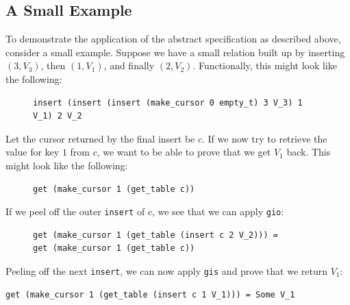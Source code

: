 \documentclass[a4paper,12pt]{article}
\begin{document}
\subsection{A Small Example} \label{subsec:ex}

To demonstrate the application of the abstract specification as described above, consider a small example. Suppose we have a small relation built up by inserting $(3,V_3)$, then $(1,V_1)$, and finally $(2,V_2)$. Functionally, this might look like the following:

\begin{figure}[h]
\begin{singlespace}
\begin{verbatim}
insert (insert (insert (make_cursor 0 empty_t) 3 V_3) 1 V_1) 2 V_2
\end{verbatim}
\end{singlespace}
\end{figure}

Let the cursor returned by the final insert be $c$. If we now try to retrieve the value for key $1$ from $c$, we want to be able to prove that we get $V_1$ back. This might look like the following:

\begin{figure}[h]
\begin{singlespace}
\begin{verbatim}
get (make_cursor 1 (get_table c))
\end{verbatim}
\end{singlespace}
\end{figure}

If we peel off the outer \texttt{insert} of $c$, we see that we can apply \texttt{gio}:

\begin{figure}[h]
\begin{singlespace}
\begin{verbatim}
get (make_cursor 1 (get_table (insert c 2 V_2))) =
get (make_cursor 1 (get_table c))
\end{verbatim}
\end{singlespace}
\end{figure}

Peeling off the next \texttt{insert}, we can now apply \texttt{gis} and prove that we return $V_1$:

\begin{singlespace}
\begin{verbatim}
get (make_cursor 1 (get_table (insert c 1 V_1))) = Some V_1
\end{verbatim}
\end{singlespace}
\end{document}
